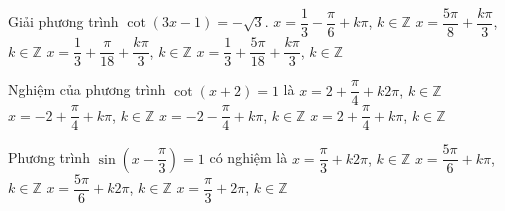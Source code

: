 \begin{ex}%
	Giải phương  trình $\cot \left( 3x-1 \right)=-\sqrt{3}$.
	\choice 
		 {$x=\dfrac{1}{3}-\dfrac{\pi}{6}+k\pi $, $k\in\mathbb{Z}$}
		{$x=\dfrac{5\pi}{8}+\dfrac{k\pi}{3}$, $k\in\mathbb{Z}$} 
		 {$x=\dfrac{1}{3}+\dfrac{\pi}{18}+\dfrac{k\pi}{3}$, $k\in\mathbb{Z}$}
		{\True $x=\dfrac{1}{3}+\dfrac{5\pi}{18}+\dfrac{k\pi}{3}$, $k\in\mathbb{Z}$} 
\end{ex}

\begin{ex}%
	Nghiệm của phương trình $\cot \left( x+2 \right)=1$  là
	\choice 
		{$x=2+\dfrac{\pi}{4}+k2\pi  $, $k\in \mathbb{Z}$}
		{\True  $x=-2+\dfrac{\pi}{4}+k\pi $, $k\in \mathbb{Z}$}
		{$x=-2-\dfrac{\pi}{4}+k\pi $, $k\in  \mathbb{Z}$}
		{$x=2+\dfrac{\pi}{4}+k\pi $, $k\in  \mathbb{Z}$}
\end{ex}

\begin{ex}%
	 Phương trình $\sin \left( x - \dfrac{\pi}{3} \right) = 1$ có nghiệm là
	 \choice
		{$x  = \dfrac{\pi}{3} + k2\pi$, $k \in \mathbb{Z}$}
		{$x = \dfrac{5\pi}{6} + k\pi$, $k \in  \mathbb{Z}$}
		 {\True $x = \dfrac{5\pi}{6} + k2\pi$, $k \in \mathbb{Z}$}
		{$x = \dfrac{\pi}{3} + 2\pi$, $k  \in \mathbb{Z}$}
\end{ex}

